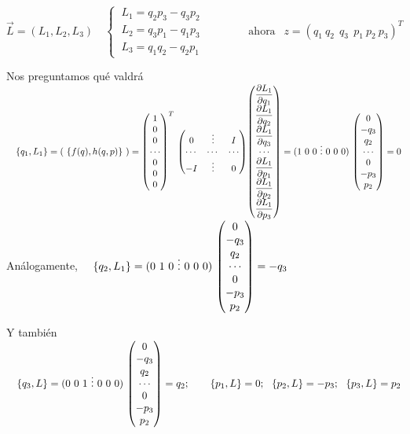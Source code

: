 $\overrightarrow L = (L_1,L_2,L_3) \quad \begin{cases} \ L_1=q_2p_3-q_3p_2 \\ \ L_2=q_3p_1-q_1p_3 \\ \ L_3=q_1q_2 - q_2p_1  \end{cases} \qquad \qquad  \text{ahora } \ \ z=(q_1\ q_2\ \ q_3 \ \ p_1\ p_2\ p_3)^T$

Nos preguntamos qué valdrá $\quad \{q_1,L_1\}= (\ \{f(q),h(q,p)\}\ ) =
\mqty(1\\0\\0 \\ \cdots \\ 0\\0\\0)^T \ \mqty( 0 & \vdots & I \\ \cdots & \cdots & \cdots  \\ -I & \vdots & 0) \mqty( \displaystyle \pdv{L_1}{q_1} \\  \displaystyle \pdv{L_1}{q_2} \\  \displaystyle \pdv{L_1}{q_3} \\ \cdots \\  \displaystyle \pdv{L_1}{p_1} \\  \displaystyle \pdv{L_1}{p_2} \\   \displaystyle \pdv{L_1}{p_3})= 
(1\ 0\ 0\  \vdots \ 0\ 0\ 0)\ \mqty(0\\ -q_3\\q_2\\ \cdots \\ 0\\-p_3 \\p_2)=0$ \hspace{2cm} Análogamente, $\quad \{q_2,L_1\}=(0\ 1\ 0 \ \vdots \ 0\ 0\ 0)\ \mqty(0\\ -q_3\\q_2\\ \cdots \\ 0\\-p_3 \\p_2)=-q_3$

 Y también $\quad \{q_3,L\}=(0\ 0\ 1 \ \vdots \ 0\ 0\ 0)\ \mqty(0\\ -q_3\\q_2\\ \cdots \\ 0\\-p_3 \\p_2)=q_2;\qquad \{p_1,L\}=0;\ \ \{p_2,L\}=-p_3;\ \ \{p_3,L\}=p_2$
 

